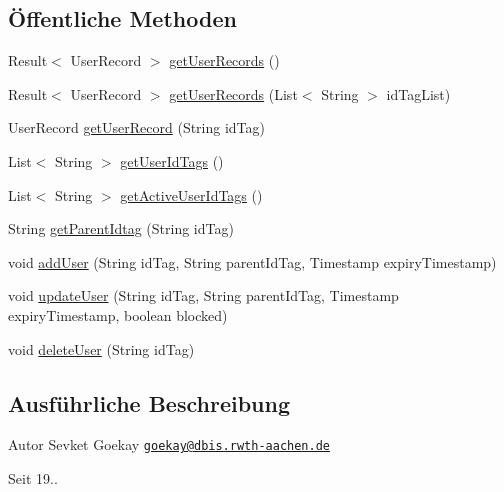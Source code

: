 \subsection*{Öffentliche Methoden}
\begin{DoxyCompactItemize}
\item 
Result$<$ User\-Record $>$ \hyperlink{interfacede_1_1rwth_1_1idsg_1_1steve_1_1repository_1_1_user_repository_aa488f418bb73217acd65537099c9afb3}{get\-User\-Records} ()
\item 
Result$<$ User\-Record $>$ \hyperlink{interfacede_1_1rwth_1_1idsg_1_1steve_1_1repository_1_1_user_repository_a71047692f661431be5f10c1f92ab626d}{get\-User\-Records} (List$<$ String $>$ id\-Tag\-List)
\item 
User\-Record \hyperlink{interfacede_1_1rwth_1_1idsg_1_1steve_1_1repository_1_1_user_repository_aa7aa9b8dc5b518eb7085983b75552a77}{get\-User\-Record} (String id\-Tag)
\item 
List$<$ String $>$ \hyperlink{interfacede_1_1rwth_1_1idsg_1_1steve_1_1repository_1_1_user_repository_a5ab1f1d0020bd06c65b90e0556a6b9d8}{get\-User\-Id\-Tags} ()
\item 
List$<$ String $>$ \hyperlink{interfacede_1_1rwth_1_1idsg_1_1steve_1_1repository_1_1_user_repository_ae5bb260082d21a1d2327e3afc6914871}{get\-Active\-User\-Id\-Tags} ()
\item 
String \hyperlink{interfacede_1_1rwth_1_1idsg_1_1steve_1_1repository_1_1_user_repository_a099d12671889952bc4071782038f7f50}{get\-Parent\-Idtag} (String id\-Tag)
\item 
void \hyperlink{interfacede_1_1rwth_1_1idsg_1_1steve_1_1repository_1_1_user_repository_ae240763e8def875900878988e05b9bbd}{add\-User} (String id\-Tag, String parent\-Id\-Tag, Timestamp expiry\-Timestamp)
\item 
void \hyperlink{interfacede_1_1rwth_1_1idsg_1_1steve_1_1repository_1_1_user_repository_a26412d46a0640e48dab9d1c45ce2c3c9}{update\-User} (String id\-Tag, String parent\-Id\-Tag, Timestamp expiry\-Timestamp, boolean blocked)
\item 
void \hyperlink{interfacede_1_1rwth_1_1idsg_1_1steve_1_1repository_1_1_user_repository_a2c408ab628cbe46d3016bd27d34b5146}{delete\-User} (String id\-Tag)
\end{DoxyCompactItemize}


\subsection{Ausführliche Beschreibung}
\begin{DoxyAuthor}{Autor}
Sevket Goekay \href{mailto:goekay@dbis.rwth-aachen.de}{\tt goekay@dbis.\-rwth-\/aachen.\-de} 
\end{DoxyAuthor}
\begin{DoxySince}{Seit}
19.. 
\end{DoxySince}


